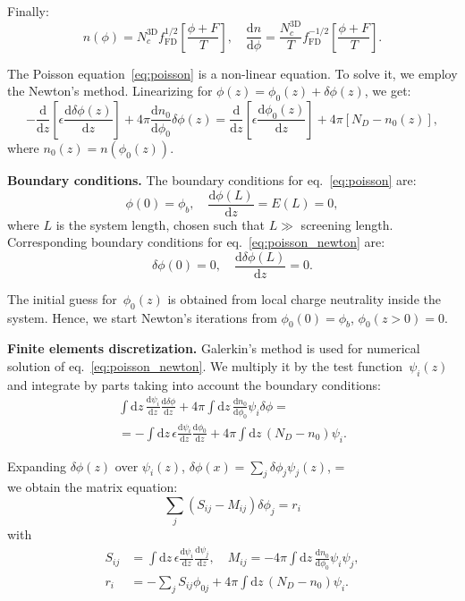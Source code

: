 \documentclass[10pt]{article}
\newcommand{\dd}{\mathrm{d}}
\newcommand{\fFD}{f_{\mathrm{FD}}}
\begin{document}
Finally:
\begin{equation}
	n(\phi) = N_c^\mathrm{3D} \fFD^{1/2} \left[ \frac{\phi + F}{T} \right], \quad
	\frac{\dd n}{\dd \phi} =
		\frac{N_c^\mathrm{3D}}{T} \fFD^{-1/2} \left[ \frac{\phi + F}{T} \right].
\end{equation}

The Poisson equation~\eqref{eq:poisson} is a non-linear equation. To solve it, we employ
the Newton's method. Linearizing for $\phi(z) = \phi_0(z) + \delta\phi(z)$, we get:
\begin{equation}
	\label{eq:poisson_newton}
	- \frac{\dd}{\dd z} \left[ \epsilon \frac{\dd \delta\phi(z)}{\dd z} \right]
	+ 4\pi \frac{\dd n_0}{\dd \phi_0} \delta\phi(z)
	= \frac{\dd}{\dd z} \left[ \epsilon \frac{\dd \phi_0(z)}{\dd z} \right]
	+ 4\pi [N_D - n_0(z)],
\end{equation}
where $n_0(z) = n(\phi_0(z))$.

\textbf{Boundary conditions.} The boundary conditions for eq.~\eqref{eq:poisson} are:
\begin{equation}
	\phi(0) = \phi_b, \quad \frac{\dd \phi(L)}{\dd z} = E(L) = 0,
\end{equation}
where $L$ is the system length, chosen such that $L \gg$ screening length. Corresponding
boundary conditions for eq.~\eqref{eq:poisson_newton} are:
\begin{equation}
	\delta\phi(0) = 0, \quad \frac{\dd \delta\phi(L)}{\dd z} = 0.
\end{equation}

The initial guess for~$\phi_0(z)$ is obtained from local charge neutrality inside the
system. Hence, we start Newton's iterations from $\phi_0(0) = \phi_b$, $\phi_0(z > 0) = 0$.

\textbf{Finite elements discretization.} Galerkin's method is used for numerical solution
of eq.~\eqref{eq:poisson_newton}. We multiply it by the test function~$\psi_i(z)$ and
integrate by parts taking into account the boundary conditions:
\begin{multline}
	\int \dd z \, \frac{\dd \psi_i}{\dd z} \frac{\dd \delta\phi}{\dd z}
	+ 4\pi \int \dd z \, \frac{\dd n_0}{\dd \phi_0} \psi_i \delta\phi = \\
	= - \int \dd z \, \epsilon \frac{\dd \psi_i}{\dd z} \frac{\dd \phi_0}{\dd z}
	+ 4\pi \int \dd z \, (N_D - n_0) \psi_i.
\end{multline}

Expanding $\delta\phi(z)$ over $\psi_i(z)$, $\delta\phi(x) = \sum_j \delta\phi_j \psi_j(z)$, = \\
we obtain the matrix equation:
\begin{equation}
	\sum_j \left( S_{ij} - M_{ij} \right) \delta\phi_j = r_i
\end{equation}
with
\begin{equation}
\begin{split}
	S_{ij} &= \int \dd z \, \epsilon \frac{\dd \psi_i}{\dd z} \frac{\dd \psi_j}{\dd z}, \quad
	M_{ij} = -4\pi \int \dd z \, \frac{\dd n_0}{\dd \phi_0} \psi_i \psi_j, \\
	r_i &= - \sum_j S_{ij} \phi_{0j} + 4\pi \int \dd z \, (N_D - n_0) \psi_i.
\end{split}
\end{equation}
\end{document}
